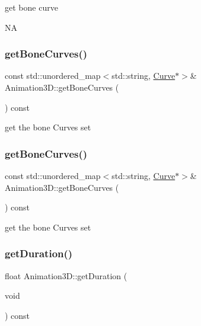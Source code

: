 get bone curve

NA \mbox{\label{classAnimation3D_a6b0c090de8c980e8665ca708ce5bda0d}} 
\subsubsection{\texorpdfstring{get\+Bone\+Curves()}{getBoneCurves()}\hspace{0.1cm}{\footnotesize\ttfamily [1/2]}}
{\footnotesize\ttfamily const std\+::unordered\+\_\+map$<$std\+::string, \hyperlink{classAnimation3D_1_1Curve}{Curve}$\ast$$>$\& Animation3\+D\+::get\+Bone\+Curves (\begin{DoxyParamCaption}{ }\end{DoxyParamCaption}) const\hspace{0.3cm}{\ttfamily [inline]}}

get the bone Curves set \mbox{\label{classAnimation3D_a6b0c090de8c980e8665ca708ce5bda0d}} 
\subsubsection{\texorpdfstring{get\+Bone\+Curves()}{getBoneCurves()}\hspace{0.1cm}{\footnotesize\ttfamily [2/2]}}
{\footnotesize\ttfamily const std\+::unordered\+\_\+map$<$std\+::string, \hyperlink{classAnimation3D_1_1Curve}{Curve}$\ast$$>$\& Animation3\+D\+::get\+Bone\+Curves (\begin{DoxyParamCaption}{ }\end{DoxyParamCaption}) const\hspace{0.3cm}{\ttfamily [inline]}}

get the bone Curves set \mbox{\label{classAnimation3D_a02900b51836629f58ceb1546beb3d8ae}} 
\subsubsection{\texorpdfstring{get\+Duration()}{getDuration()}\hspace{0.1cm}{\footnotesize\ttfamily [1/2]}}
{\footnotesize\ttfamily float Animation3\+D\+::get\+Duration (\begin{DoxyParamCaption}\item[{void}]{ }\end{DoxyParamCaption}) const\hspace{0.3cm}{\ttfamily [inline]}}

